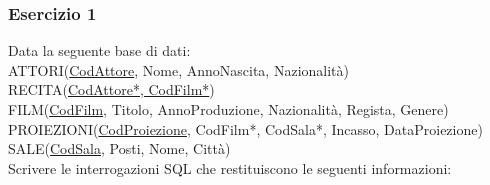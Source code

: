 \documentclass[a4paper]{article}
\begin{document}
\subsubsection{Esercizio 1}
Data la seguente base di dati:\medskip\\
ATTORI(\underline{CodAttore}, Nome, AnnoNascita, Nazionalità)\\
RECITA(\underline{CodAttore*, CodFilm*})\\
FILM(\underline{CodFilm}, Titolo, AnnoProduzione, Nazionalità, Regista, Genere)\\
PROIEZIONI(\underline{CodProiezione}, CodFilm*, CodSala*, Incasso, DataProiezione)\\
SALE(\underline{CodSala}, Posti, Nome, Città)\medskip\\
%
Scrivere le interrogazioni SQL che restituiscono le seguenti informazioni:
\end{document}
